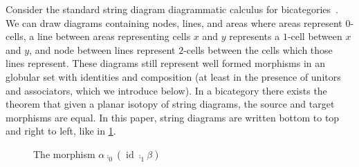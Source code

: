 \documentclass{article}
\DeclareMathOperator{\id}{id}
\begin{document}
Consider the standard string diagram diagrammatic calculus for
bicategories~\cite{heunen2019categories,selinger2010survey}. We
can draw diagrams containing nodes, lines, and areas where areas
represent \(0\)-cells, a line between areas representing cells \(x\)
and \(y\) represents a \(1\)-cell between \(x\) and \(y\), and node
between lines represent \(2\)-cells between the cells which those lines
represent. These diagrams still represent well formed morphisms in an
globular set with identities and composition (at least in the presence
of unitors and associators, which we introduce below). In a bicategory
there exists the theorem that given a planar isotopy of string
diagrams, the source and target morphisms are equal. In this paper, string diagrams are written bottom to top and right to left, like in \cref{fig:example-string}.

\begin{figure}
  \centering

  \caption{The morphism \(\alpha \comp_0 (\id \comp_1 \beta)\)}
  \label{fig:example-string}
\end{figure}
\end{document}
